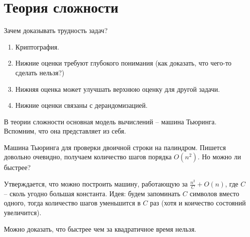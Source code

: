 \section{Теория сложности}
 
Зачем доказывать трудность задач?
\begin{enumerate}
    \item Криптография.
    \item Нижние оценки требуют глубокого понимания (как доказать, что чего-то сделать нельзя?)
    \item Нижняя оценка может улучшать верхнюю оценку для другой задачи.
    \item Нижние оценки связаны с дерандомизацией.
\end{enumerate}
 
В теории сложности основная модель вычислений -- машина Тьюринга. Вспомним, что она представляет из себя.
 
\begin{example}
    Машина Тьюринга для проверки двоичной строки на палиндром. Пишется довольно очевидно, получаем количество шагов порядка $O(n^2)$. Но можно ли быстрее?
 
    Утверждается, что можно построить машину, работающую за $\frac{n^2}{C} + O(n)$, где $C$ -- сколь угодно большая константа. Идея: будем запоминать $C$ символов вместо одного, тогда количество шагов уменьшится в $C$ раз (хотя и коичество состояний увеличится).
 
    Можно доказать, что быстрее чем за квадратичное время нельзя.
\end{example}
 
